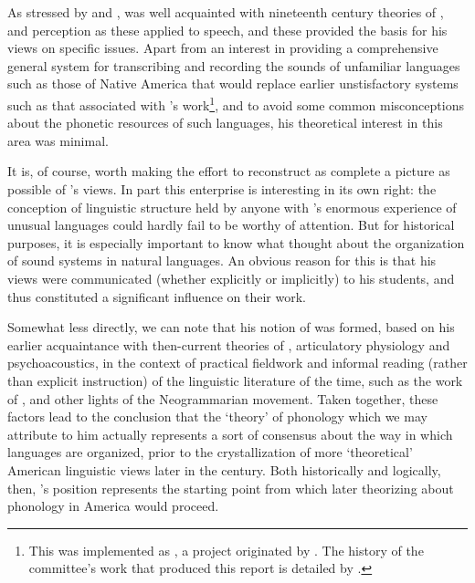 As stressed by \citet{mackert94:boas} and
\citet{silverstein21:boas.sapir.bloomfield}, {\Boas} was well acquainted
with nineteenth century theories of ,  and
perception as these applied to speech, and these provided the basis
for his views on specific issues. Apart from an interest in providing
a comprehensive general system for transcribing and recording the
sounds of unfamiliar languages such as those of Native America that
would replace earlier unstisfactory systems such as that associated
with {\Powell}'s work\footnote{This was implemented as
  \citealt{boas.etal16:transcription}, a project originated by {\Sapir}.
  The history of the committee's work that produced this report is
  detailed by \citealt{silverstein91:rvw.darnell}.}, and to avoid some
common misconceptions about the phonetic resources of such languages,
his theoretical interest in this area was minimal.

It is, of course, worth making the effort to reconstruct as complete a
picture as possible of {\Boas}'s views. In part this enterprise is
interesting in its own right: the conception of linguistic structure
held by anyone with {\Boas}'s enormous experience of unusual languages
could hardly fail to be worthy of attention. But for historical
purposes, it is especially important to know what {\Boas} thought about
the organization of sound systems in natural languages. An obvious
reason for this is that his views were communicated (whether
explicitly or implicitly) to his students, and thus constituted a
significant influence on their work.

Somewhat less directly, we can note that his notion of 
was formed, based on his earlier acquaintance with then-current
theories of , articulatory physiology and psychoacoustics, in
the context of practical fieldwork and informal reading (rather than
explicit instruction) of the linguistic literature of the time, such
as the work of ,  and other lights of the
Neogrammarian movement. Taken together, these factors lead to the
conclusion that the `theory' of phonology which we may attribute to
him actually represents a sort of consensus about the way in which
languages are organized, prior to the crystallization of more
`theoretical' American linguistic views later in the century. Both
historically and logically, then, {\Boas}'s position represents the
starting point from which later theorizing about phonology in America
would proceed.

